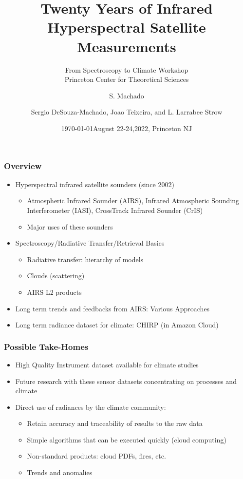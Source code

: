 \documentclass[10pt,t]{beamer}
\author{S. Machado}
\date{\today}
\title{\large Twenty Years of Infrared Hyperspectral Satellite Measurements}
\subtitle{\footnotesize{From Spectroscopy to Climate Workshop \\ \vspace{-0.07in} Princeton Center for Theoretical Sciences}}
\date{\vspace{0.1in}\footnotesize{August 22-24,2022, Princeton NJ \vfill}}
\author{Sergio DeSouza-Machado\inst{1}, Joao Teixeira\inst{2}, and L. Larrabee Strow\inst{1}}
\institute{\inst{1}UMBC Physics Department \and \inst{2}NASA Jet Propulsion Laboratory}
\begin{document}
\maketitle
\begin{frame}
  \frametitle{Overview}  
  \begin{itemize}
  \item Hyperspectral infrared satellite sounders (since 2002)
    \begin{itemize}
    \item Atmospheric Infrared Sounder (AIRS), Infrared Atmospheric Sounding Interferometer (IASI), CrossTrack Infrared Sounder (CrIS)
    \item Major uses of these sounders
    \end{itemize}
  \item Spectroscopy/Radiative Transfer/Retrieval Basics
    \begin{itemize}
    \item Radiative transfer: hierarchy of models
    \item Clouds (scattering)
    \item AIRS L2 products
    \end{itemize}
  \end{itemize}
  \begin{itemize}
  \item Long term trends and feedbacks from AIRS: Various Approaches
  \item Long term radiance dataset for climate: CHIRP (in Amazon Cloud)
  \end{itemize}
\end{frame}
\begin{frame}
  \frametitle{Possible Take-Homes}
  \begin{itemize}
  \item High Quality Instrument dataset available for climate studies
  \item Future research with these sensor datasets concentrating on processes and climate
  \item Direct use of radiances by the climate community:
    \begin{itemize}
    \item Retain accuracy and traceability of results to the raw data
    \item Simple algorithms that can be executed quickly (cloud computing)
    \item Non-standard products: cloud PDFs, fires, etc.
    \item Trends and anomalies
    \end{itemize}
  \end{itemize}
\end{frame}
\end{document}
